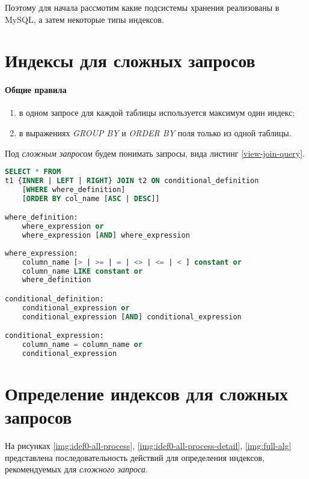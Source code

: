 Поэтому для начала рассмотим какие подсистемы хранения реализованы в MySQL,
 а затем некоторые типы индексов.  











\section{Индексы для сложных запросов}


\paragraph{Общие правила}

\begin{enumerate}
\item в одном запросе для каждой таблицы используется максимум один индекс;
\item в выражениях \textit{GROUP BY} и \textit{ORDER BY} поля только из одной таблицы.
\end{enumerate}


Под \textit{сложным запросом} будем понимать запросы, вида листинг \ref{view-join-query}.

\begin{lstlisting}[language=sql, caption={Вид сложного запроса},label=view-join-query]
SELECT * FROM
t1 {INNER | LEFT | RIGHT} JOIN t2 ON conditional_definition
    [WHERE where_definition]
    [ORDER BY col_name [ASC | DESC]]

where_definition:
    where_expression or 
    where_expression [AND] where_expression 
    
where_expression:
    column_name [> | >= | = | <> | <= | < ] constant or
    column_name LIKE constant or 
    where_definition   

conditional_definition:
    conditional_expression or 
    conditional_expression [AND] conditional_expression 

conditional_expression:
    column_name = column_name or
    conditional_expression
\end{lstlisting}

\section{Определение индексов для сложных запросов}

На рисунках \ref{img:idef0-all-process}, \ref{img:idef0-all-process-detail}, \ref{img:full-alg} представлена последовательность действий для определения индексов, рекомендуемых для \textit{сложного запроса}.


